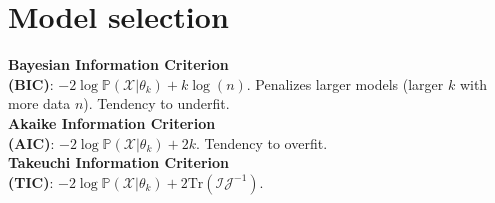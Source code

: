 \section*{Model selection}
\textbf{Bayesian Information Criterion\\ (BIC)}: $-2\log\mathbb{P}(\mathcal{X}|\theta_k)+k\log(n)$. Penalizes larger models (larger $k$ with more data $n$). Tendency to underfit.\\
\textbf{Akaike Information Criterion\\ (AIC)}: $-2\log\mathbb{P}(\mathcal{X}|\theta_k)+2k$. Tendency to overfit.\\
\textbf{Takeuchi Information Criterion\\ (TIC)}: $-2\log\mathbb{P}(\mathcal{X}|\theta_k)+2\text{Tr}(\mathcal{I}\mathcal{J}^{-1})$.
